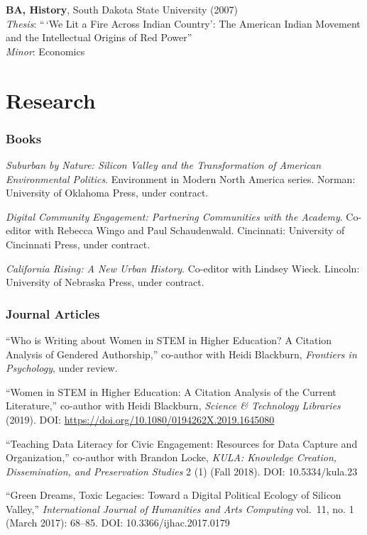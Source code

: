 \textbf{BA, History}, South Dakota State University (2007)\\
\emph{Thesis}: ``\,`We Lit a Fire Across Indian Country': The American
Indian Movement and the Intellectual Origins of Red Power''\\
\emph{Minor}: Economics

\section{Research}\label{research}

\subsubsection{Books}\label{books}

\emph{Suburban by Nature: Silicon Valley and the Transformation of
American Environmental Politics}. Environment in Modern North America
series. Norman: University of Oklahoma Press, under contract.

\emph{Digital Community Engagement: Partnering Communities with the
Academy}. Co-editor with Rebecca Wingo and Paul Schaudenwald.
Cincinnati: University of Cincinnati Press, under contract.

\emph{California Rising: A New Urban History}. Co-editor with Lindsey
Wieck. Lincoln: University of Nebraska Press, under contract.

\subsubsection{Journal Articles}\label{journal-articles}

``Who is Writing about Women in STEM in Higher Education? A Citation
Analysis of Gendered Authorship,'' co-author with Heidi Blackburn,
\emph{Frontiers in Psychology}, under review.

``Women in STEM in Higher Education: A Citation Analysis of the Current
Literature,'' co-author with Heidi Blackburn, \emph{Science \&
Technology Libraries} (2019). DOI:
\href{10.1080/0194262X.2019.1645080}{https://doi.org/10.1080/0194262X.2019.1645080}

``Teaching Data Literacy for Civic Engagement: Resources for Data
Capture and Organization,'' co-author with Brandon Locke, \emph{KULA:
Knowledge Creation, Dissemination, and Preservation Studies} 2 (1) (Fall
2018). DOI: 10.5334/kula.23

``Green Dreams, Toxic Legacies: Toward a Digital Political Ecology of
Silicon Valley,'' \emph{International Journal of Humanities and Arts
Computing} vol.~11, no. 1 (March 2017): 68--85. DOI:
10.3366/ijhac.2017.0179

